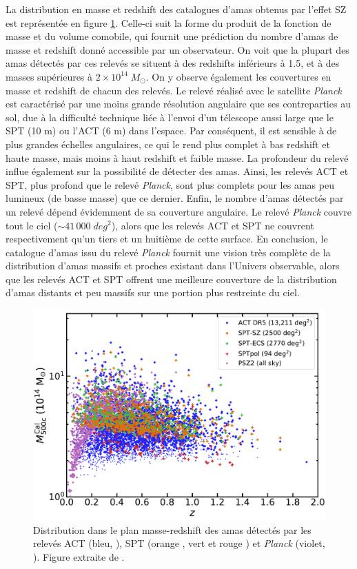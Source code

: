 La distribution en masse et redshift des catalogues d'amas obtenus par l'effet SZ est représentée en figure \ref{fig:cluster_catalogs_mz}.
Celle-ci suit la forme du produit de la fonction de masse et du volume comobile, qui fournit une prédiction du nombre d'amas de masse et redshift donné accessible par un observateur\footnotemark.
On voit que la plupart des amas détectés par ces relevés se situent à des redshifts inférieurs à 1.5, et à des masses supérieures à $2 \times 10^{14} \;M_\odot$.
On y observe également les couvertures en masse et redshift de chacun des relevés.
Le relevé réalisé avec le satellite \textit{Planck} est caractérisé par une moins grande résolution angulaire que ses contreparties au sol, due à la difficulté technique liée à l'envoi d'un télescope aussi large que le SPT (10 m) ou l'ACT (6 m) dans l'espace.
Par conséquent, il est sensible à de plus grandes échelles angulaires, ce qui le rend plus complet à bas redshift et haute masse, mais moins à haut redshift et faible masse.
La profondeur du relevé influe également sur la possibilité de détecter des amas.
Ainsi, les relevés ACT et SPT, plus profond que le relevé \textit{Planck}, sont plus complets pour les amas peu lumineux (de basse masse) que ce dernier.
Enfin, le nombre d'amas détectés par un relevé dépend évidemment de sa couverture angulaire.
Le relevé \textit{Planck} couvre tout le ciel ($\sim 41\,000 \;\unit{deg^2}$), alors que les relevés ACT et SPT ne couvrent respectivement qu'un tiers et un huitième de cette surface.
En conclusion, le catalogue d'amas issu du relevé \textit{Planck} fournit une vision très complète de la distribution d'amas massifs et proches existant dans l'Univers observable, alors que les relevés ACT et SPT offrent une meilleure couverture de la distribution d'amas distants et peu massifs sur une portion plus restreinte du ciel.

\begin{figure}[t]
    \centering
    \includegraphics[width=.6\textwidth]{Figures/Chap_amas/mz_sz.pdf}
    \caption{
        Distribution dans le plan masse-redshift des amas détectés par les relevés ACT (bleu, \cite{hilton_atacama_2021}), SPT (orange \cite{bleem_galaxy_2015}, vert \cite{bleem_sptpol_2020} et rouge \cite{huang_galaxy_2020}) et \textit{Planck} (violet, \cite{planck_collaboration_planck_2016-1}).
        Figure extraite de \cite{hilton_atacama_2021}.
    }
    \label{fig:cluster_catalogs_mz}
\end{figure}

